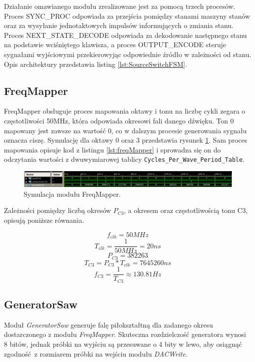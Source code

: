 \documentclass[a4paper,12pt]{article}
\begin{document}
Działanie omawianego modułu zrealizowane jest za pomocą trzech procesów. Proces SYNC\_PROC odpowiada za przejścia pomiędzy stanami maszyny stanów oraz za wysyłanie jednotaktowych impulsów informujących o zmiania stanu. Proces NEXT\_STATE\_DECODE odpowiada za dekodowanie następnego stanu na podstawie wciśniętego klawisza, a proces OUTPUT\_ENCODE steruje sygnałami wyjściowymi przekierowyjąc odpowiednie źródło w zależności od stanu. Opis architektury przedstawia listing \ref{lst:SourceSwitchFSM}.


\subsection{FreqMapper}
FreqMapper obsługuje proces mapowania oktawy i tonu na liczbę cykli zegara o częstotliwości 50MHz, która odpowiada okresowi fali danego dźwięku. Ton 0 mapowany jest zawsze na wartość 0, co w dalszym procesie generowania sygnału oznacza ciszę. Symulację dla oktawy 0 oraz 3 przedstawia rysunek \ref{sim:mapper}. Sam proces mapowania opisuje kod z listingu \ref{lst:freqMapper} i sprowadza się on do odczytania wartości z dwuwymiarowej tablicy \lstinline{Cycles_Per_Wave_Period_Table}.
\begin{figure}[H]
  \centering
  \includegraphics[decodearray={1 0 1 0 1 0}, width=\linewidth]{images/mapper}
  \caption{Symulacja modułu FreqMapper.}
  \label{sim:mapper}
\end{figure}

Zależności pomiędzy liczbą okresów $P_{C3}$, a okresem oraz częstotliwością tonu C3, opisują poniższe równania.

\[ f_{clk} = 50MHz \]
\[ T_{clk} = \frac{1}{50MHz} = 20ns \]
\[ P_{C3} = 382263 \]
\[ T_{C3} = P_{C3} * T_{clk} = 7645260ns \]
\[ f_{C3} = \frac{1}{T_{C3}} \approx 130.81Hz \]




\subsection{GeneratorSaw}

Moduł \textit{GeneratorSaw} generuje falę piłokształtną dla zadanego okresu dostarczonego z modułu \textit{FreqMapper}. Skuteczna rozdzielczość generatora wynosi 8 bitów, jednak próbki na wyjściu są przesuwane o 4 bity w lewo, aby osiągnąć zgodność z rozmiarem próbki na wejściu modułu \textit{DACWrite}.
\end{document}
